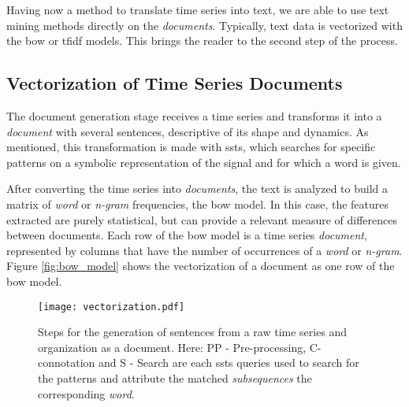 Having now a method to translate time series into text, we are able to use text mining methods directly on the \textit{documents}. Typically, text data is vectorized with the \gls{bow} or \gls{tfidf} models. This brings the reader to the second step of the process.

\subsection{Vectorization of Time Series Documents}

The document generation stage receives a time series and transforms it into a \textit{document} with several sentences, descriptive of its shape and dynamics. As mentioned, this transformation is made with \gls{ssts}, which searches for specific patterns on a symbolic representation of the signal and for which a word is given.  
\par
After converting the time series into \textit{documents}, the text is analyzed to build a matrix of \textit{word} or \textit{n-gram }frequencies, the \gls{bow} model. In this case, the features extracted are purely statistical, but can provide a relevant measure of differences between documents. Each row of the \gls{bow} model is a time series \textit{document}, represented by columns that have the number of occurrences of a \textit{word} or \textit{n-gram}. Figure \ref{fig:bow_model} shows the vectorization of a document as one row of the \gls{bow} model.

\begin{figure}[!h]
    \centering
    \texttt{[image: vectorization.pdf]}
    \caption{Steps for the generation of sentences from a raw time series and organization as a document. Here: {PP - Pre-processing, C- connotation and S - Search} are each \gls{ssts} queries used to search for the patterns and attribute the matched \textit{subsequences} the corresponding \textit{word}.}
    \label{fig:sentence_gen}
\end{figure}

